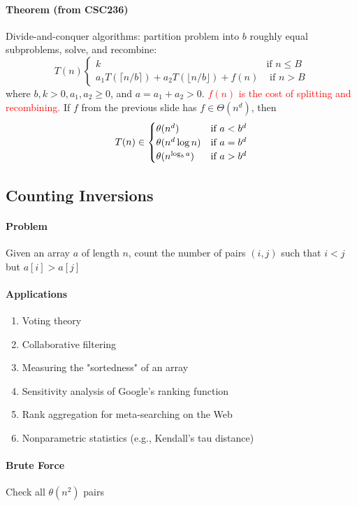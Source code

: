 \documentclass[11pt]{article}
\begin{document}
\paragraph{Theorem (from CSC236)}
Divide-and-conquer algorithms: partition problem into $b$ roughly equal subproblems, solve, and recombine:
$$T(n) \begin{cases}
	k & \text{if $n \leq B$} \\
a_1T(\lceil n / b \rceil) + a_2T(\lfloor n/b \rfloor) + f(n) & \text{ if $n > B$}
\end{cases}$$
where $b, k >0, a_1, a_2 \geq 0$, and $a = a_1 + a_2 > 0$. \textcolor{red}{$f(n)$ is the cost of splitting and recombining.} If $f$ from the previous slide has $f \in \Theta(n^d)$, then
$$T(n) \in \begin{cases}
	\theta(n^d) & \text{if $ a < b^d$} \\
	\theta(n^d\log n) & \text{if $a = b^d$} \\
	\theta(n^{\log_b a}) & \text{if $a > b^d$}
\end{cases}
$$
\subsection{Counting Inversions}
\paragraph{Problem}
Given an array $a$ of length $n$, count the number of pairs $(i,j)$ such that $i < j$ but $a[i] > a[j]$
\paragraph{Applications}
\begin{enumerate}
	\item Voting theory
	\item Collaborative filtering
	\item Measuring the "sortedness" of an array
	\item Sensitivity analysis of Google's ranking function
	\item Rank aggregation for meta-searching on the Web
	\item Nonparametric statistics (e.g., Kendall's tau distance)
\end{enumerate}

\paragraph{Brute Force}
Check all $\theta(n^2)$ pairs
\end{document}
